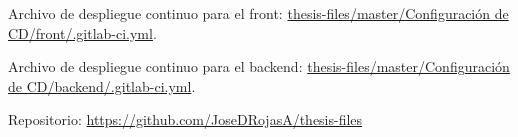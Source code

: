 \newpage
{}\label{appendix:Archivos de configuracion de despliegue continuo}

Archivo de despliegue continuo para el front: \href{https://raw.githubusercontent.com/JoseDRojasA/thesis-files/master/Configuración de CD/front/.gitlab-ci.yml}{thesis-files/master/Configuraci\'on de CD/front/.gitlab-ci.yml}.

\noindent Archivo de despliegue continuo para el backend: \href{https://raw.githubusercontent.com/JoseDRojasA/thesis-files/master/Configuración de CD/backend/.gitlab-ci.yml}{thesis-files/master/Configuraci\'on de CD/backend/.gitlab-ci.yml}.


\noindent Repositorio: \url{https://github.com/JoseDRojasA/thesis-files}